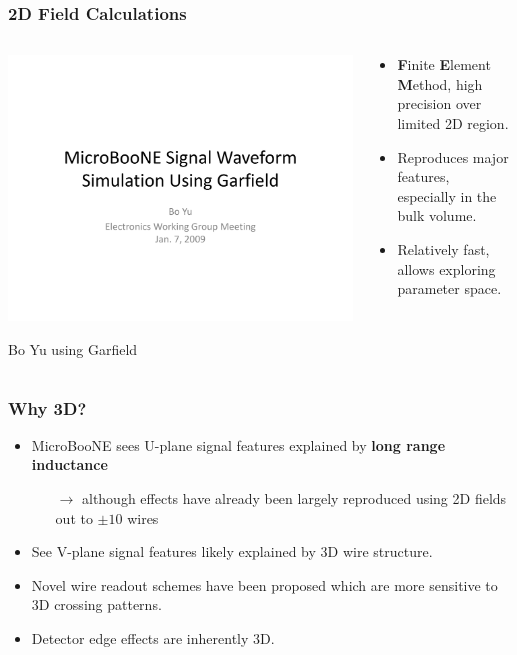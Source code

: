 \documentclass[xcolor=dvipsnames]{beamer}
\begin{document}
\begin{frame}
  \frametitle{2D Field Calculations}
  \begin{columns}
    \begin{column}{0.5\textwidth}
      \begin{center}
        \includegraphics[width=\textwidth,page=5,clip,trim=0 0 0 5mm]{GarfieldSimulation-BoYu.pdf}

        Bo Yu using Garfield
      \end{center}
    \end{column}
    \begin{column}{0.5\textwidth}
      \begin{itemize}
      \item \textbf{F}inite \textbf{E}lement \textbf{M}ethod, high
        precision over limited 2D region.
      \item Reproduces major features, especially in the bulk volume.
      \item Relatively fast, allows exploring parameter space.
      \end{itemize}
    \end{column}
  \end{columns}

\end{frame}

\begin{frame}
  \frametitle{Why 3D?}
  \begin{itemize}
  \item MicroBooNE sees U-plane signal features explained by
    \textbf{long range inductance}
    \begin{itemize}\footnotesize
    \item[$\rightarrow$] although effects have already been largely
      reproduced using 2D fields out to $\pm10$ wires
    \end{itemize}
  \item See V-plane signal features likely explained by 3D wire
    structure.
  \item Novel wire readout schemes have been proposed which are more
    sensitive to 3D crossing patterns.
  \item Detector edge effects are inherently 3D.
  \end{itemize}
\end{frame}
\end{document}
